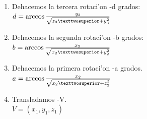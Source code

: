 \begin{enumerate}
\item Dehacemos la tercera rotaci'on -d grados: \bigskip \\
$d = \arccos {y_3 \over {\sqrt{z_3²+y_3^2}}}$
\item Dehacemos la segunda rotaci'on -b grados: \bigskip \\ $b = \arccos {x_2 \over {\sqrt{x_2²+y_2^2}}}$
\item Dehacemos la primera rotaci'on -a grados.\bigskip \\ $a = \arccos {x_2 \over {\sqrt{x_2²+z_2^2}}}$
\item Transladamos -V. \bigskip \\ $V = (x_1,y_1,z_1)$
\end{enumerate}

